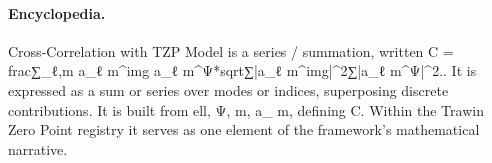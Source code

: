 \paragraph{Encyclopedia.}
Cross-Correlation with TZP Model is a series / summation, written C = frac∑\_ℓ,m a\_ℓ m\textasciicircum{}img a\_ℓ m\textasciicircum{}Ψ*sqrt∑|a\_ℓ m\textasciicircum{}img|\textasciicircum{}2∑|a\_ℓ m\textasciicircum{}Ψ|\textasciicircum{}2.. It is expressed as a sum or series over modes or indices, superposing discrete contributions. It is built from ell, Ψ, m, a\_ m, defining C. Within the Trawin Zero Point registry it serves as one element of the framework's mathematical narrative.

